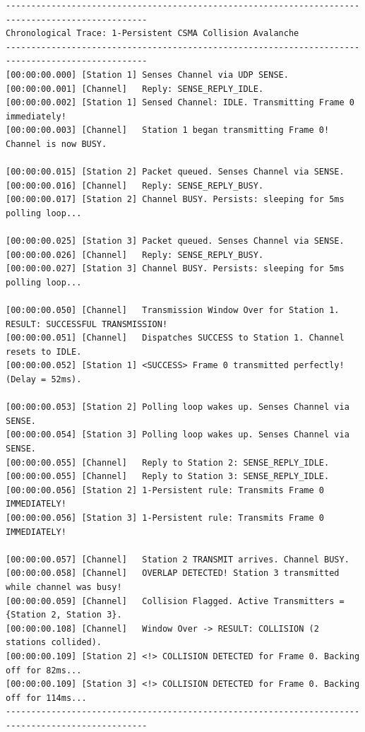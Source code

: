 \documentclass[12pt, a4paper]{article}
\begin{document}
\begin{scriptsize}
\begin{verbatim}
--------------------------------------------------------------------------------------------------
Chronological Trace: 1-Persistent CSMA Collision Avalanche
--------------------------------------------------------------------------------------------------
[00:00:00.000] [Station 1] Senses Channel via UDP SENSE.
[00:00:00.001] [Channel]   Reply: SENSE_REPLY_IDLE.
[00:00:00.002] [Station 1] Sensed Channel: IDLE. Transmitting Frame 0 immediately!
[00:00:00.003] [Channel]   Station 1 began transmitting Frame 0! Channel is now BUSY.

[00:00:00.015] [Station 2] Packet queued. Senses Channel via SENSE.
[00:00:00.016] [Channel]   Reply: SENSE_REPLY_BUSY.
[00:00:00.017] [Station 2] Channel BUSY. Persists: sleeping for 5ms polling loop...

[00:00:00.025] [Station 3] Packet queued. Senses Channel via SENSE.
[00:00:00.026] [Channel]   Reply: SENSE_REPLY_BUSY.
[00:00:00.027] [Station 3] Channel BUSY. Persists: sleeping for 5ms polling loop...

[00:00:00.050] [Channel]   Transmission Window Over for Station 1. RESULT: SUCCESSFUL TRANSMISSION!
[00:00:00.051] [Channel]   Dispatches SUCCESS to Station 1. Channel resets to IDLE.
[00:00:00.052] [Station 1] <SUCCESS> Frame 0 transmitted perfectly! (Delay = 52ms).

[00:00:00.053] [Station 2] Polling loop wakes up. Senses Channel via SENSE.
[00:00:00.054] [Station 3] Polling loop wakes up. Senses Channel via SENSE.
[00:00:00.055] [Channel]   Reply to Station 2: SENSE_REPLY_IDLE.
[00:00:00.055] [Channel]   Reply to Station 3: SENSE_REPLY_IDLE.
[00:00:00.056] [Station 2] 1-Persistent rule: Transmits Frame 0 IMMEDIATELY!
[00:00:00.056] [Station 3] 1-Persistent rule: Transmits Frame 0 IMMEDIATELY!

[00:00:00.057] [Channel]   Station 2 TRANSMIT arrives. Channel BUSY.
[00:00:00.058] [Channel]   OVERLAP DETECTED! Station 3 transmitted while channel was busy!
[00:00:00.059] [Channel]   Collision Flagged. Active Transmitters = {Station 2, Station 3}.
[00:00:00.108] [Channel]   Window Over -> RESULT: COLLISION (2 stations collided).
[00:00:00.109] [Station 2] <!> COLLISION DETECTED for Frame 0. Backing off for 82ms...
[00:00:00.109] [Station 3] <!> COLLISION DETECTED for Frame 0. Backing off for 114ms...
--------------------------------------------------------------------------------------------------
\end{verbatim}
\end{scriptsize}
\end{document}

